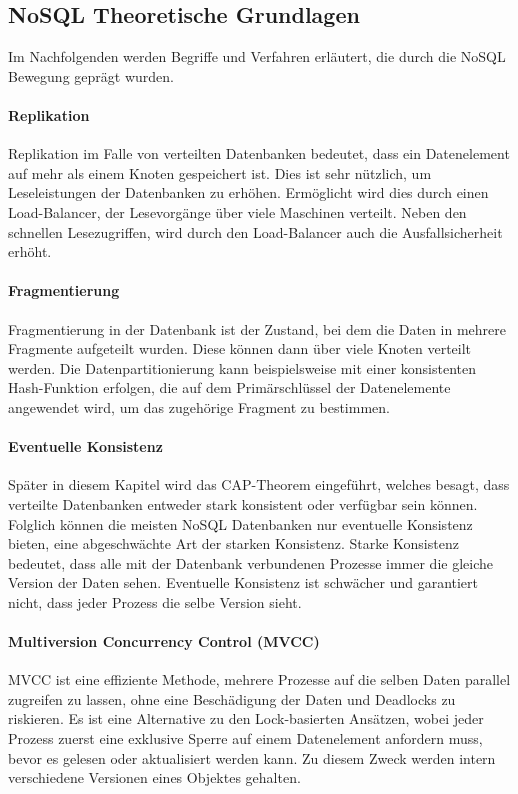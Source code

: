 \subsection{NoSQL Theoretische Grundlagen}
\label{ch:grundlagen:sec:NoSQL:NoSQLBasics}

Im Nachfolgenden werden Begriffe und Verfahren erläutert, die durch die NoSQL Bewegung geprägt wurden.

\paragraph{Replikation} Replikation im Falle von verteilten Datenbanken bedeutet, dass ein Datenelement auf mehr als einem Knoten gespeichert ist. Dies ist sehr nützlich, um Leseleistungen der Datenbanken zu erhöhen. Ermöglicht wird dies durch einen Load-Balancer, der Lesevorgänge über viele Maschinen verteilt. Neben den schnellen Lesezugriffen, wird durch den Load-Balancer auch die Ausfallsicherheit erhöht.  

\paragraph{Fragmentierung} Fragmentierung in der Datenbank ist der Zustand, bei dem die Daten in mehrere Fragmente aufgeteilt wurden. Diese können dann über viele Knoten verteilt werden. Die Datenpartitionierung kann beispielsweise mit einer konsistenten Hash-Funktion erfolgen, die auf dem Primärschlüssel der Datenelemente angewendet wird, um das zugehörige Fragment zu bestimmen.

\paragraph{Eventuelle Konsistenz} Später in diesem Kapitel wird das CAP-Theorem eingeführt, welches besagt, dass verteilte Datenbanken entweder stark konsistent oder verfügbar sein können. Folglich können die meisten NoSQL Datenbanken nur eventuelle Konsistenz bieten, eine abgeschwächte Art der starken Konsistenz. Starke Konsistenz bedeutet, dass alle mit der Datenbank verbundenen Prozesse immer die gleiche Version der Daten sehen. Eventuelle Konsistenz ist schwächer und garantiert nicht, dass jeder Prozess die selbe Version sieht.

\paragraph{Multiversion Concurrency Control (MVCC)} MVCC ist eine effiziente Methode, mehrere Prozesse auf die selben Daten parallel zugreifen zu lassen, ohne eine Beschädigung der Daten und Deadlocks zu riskieren. Es ist eine Alternative zu den Lock-basierten Ansätzen, wobei jeder Prozess zuerst eine exklusive Sperre auf einem Datenelement anfordern muss, bevor es gelesen oder aktualisiert werden kann. Zu diesem Zweck werden intern verschiedene Versionen eines Objektes gehalten.

